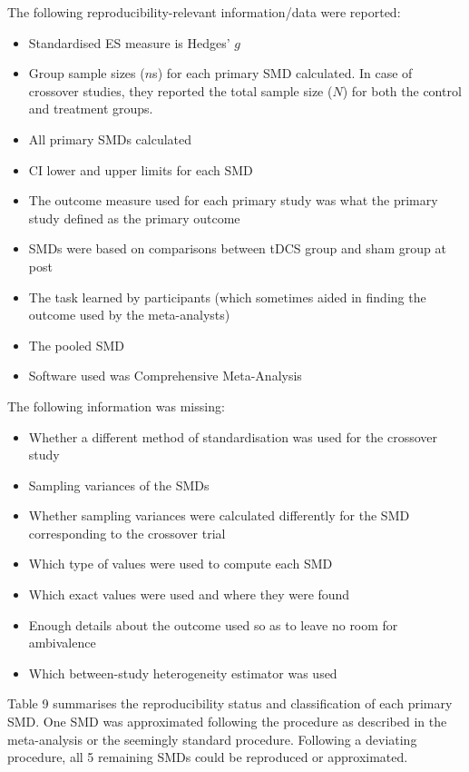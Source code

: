 \documentclass[
  man,floatsintext]{apa6}
\providecommand{\tightlist}{%
  \setlength{\itemsep}{0pt}\setlength{\parskip}{0pt}}
\begin{document}
The following reproducibility-relevant information/data were reported:

\begin{itemize}
\tightlist
\item
  Standardised ES measure is Hedges' \(g\)
\item
  Group sample sizes (\(n\)s) for each primary SMD calculated. In case of crossover studies, they reported the total sample size (\(N\)) for both the control and treatment groups.
\item
  All primary SMDs calculated
\item
  CI lower and upper limits for each SMD
\item
  The outcome measure used for each primary study was what the primary study defined as the primary outcome
\item
  SMDs were based on comparisons between tDCS group and sham group at post
\item
  The task learned by participants (which sometimes aided in finding the outcome used by the meta-analysts)
\item
  The pooled SMD
\item
  Software used was Comprehensive Meta-Analysis
\end{itemize}

The following information was missing:

\begin{itemize}
\tightlist
\item
  Whether a different method of standardisation was used for the crossover study
\item
  Sampling variances of the SMDs
\item
  Whether sampling variances were calculated differently for the SMD corresponding to the crossover trial
\item
  Which type of values were used to compute each SMD
\item
  Which exact values were used and where they were found
\item
  Enough details about the outcome used so as to leave no room for ambivalence
\item
  Which between-study heterogeneity estimator was used
\end{itemize}

Table 9 summarises the reproducibility status and classification of each primary SMD. One SMD was approximated following the procedure as described in the meta-analysis or the seemingly standard procedure. Following a deviating procedure, all 5 remaining SMDs could be reproduced or approximated.
\end{document}
